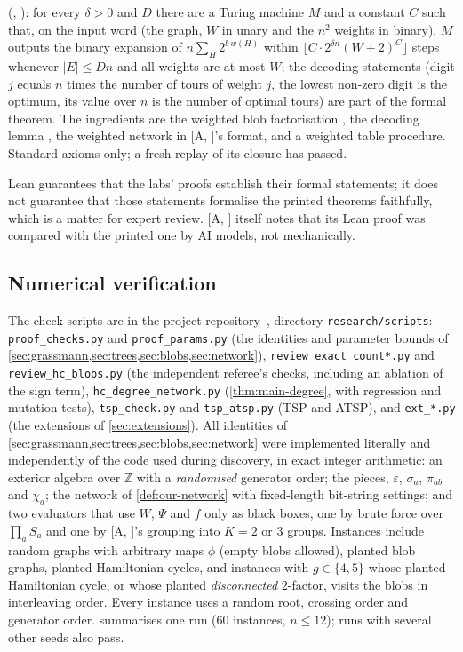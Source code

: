 \documentclass[11pt]{amsart}
\theoremstyle{plain}
\theoremstyle{definition}
\theoremstyle{remark}
\numberwithin{equation}{section}
\newcommand{\Z}{\mathbb{Z}}
\newcommand{\A}[1][]{\textup{[A\if\relax\detokenize{#1}\relax\else, #1\fi]}}
\begin{document}
\begin{itemize}
(, ): for every $\delta>0$ and $D$ there are a Turing
machine $M$ and a constant $C$ such that, on the input word  (the graph, $W$
in unary and the $n^2$ weights in binary), $M$ outputs the binary expansion of
$n\sum_H2^{b\,w(H)}$ within $\lfloor C\cdot2^{\delta n}(W+2)^C\rfloor$ steps whenever $|E|\le Dn$
and all weights are at most $W$; the decoding statements (digit $j$ equals $n$ times the number
of tours of weight $j$, the lowest non-zero digit is the optimum, its value over $n$ is the number
of optimal tours) are part of the formal theorem. The ingredients are the weighted blob
factorisation , the decoding lemma , the
weighted network  in \A's  format, and a weighted table procedure.
Standard axioms only; a fresh  replay of its closure has passed.
\end{itemize}
Lean guarantees that the labs' proofs establish their formal statements; it does not guarantee
that those statements formalise the printed theorems faithfully, which is a matter for expert
review. \A{} itself notes that its Lean proof was compared with the printed one by AI models, not
mechanically.

\subsection{Numerical verification}
The check scripts are in the project repository~\cite{TulsyanRepo26}, directory
\texttt{research/scripts}:
\texttt{proof\_checks.py} and \texttt{proof\_params.py} (the identities and parameter bounds of
\cref{sec:grassmann,sec:trees,sec:blobs,sec:network}), \texttt{review\_exact\_count*.py} and
\texttt{review\_hc\_blobs.py} (the independent referee's checks, including an ablation of the sign
term), \texttt{hc\_degree\_network.py} (\cref{thm:main-degree}, with regression and mutation tests),
\texttt{tsp\_check.py} and \texttt{tsp\_atsp.py} (TSP and ATSP), and \texttt{ext\_*.py} (the extensions
of \cref{sec:extensions}).
All identities of \cref{sec:grassmann,sec:trees,sec:blobs,sec:network} were implemented literally
and independently of the code used during discovery, in exact integer arithmetic: an exterior
algebra over $\Z$ with a \emph{randomised} generator order; the pieces, $\varepsilon$,
$\sigma_a$, $\pi_{ab}$ and $\chi_a$; the network of \cref{def:our-network} with fixed-length
bit-string settings; and two evaluators that use $W$, $\Psi$ and $f$ only as black boxes, one by
brute force over $\prod_aS_a$ and one by \A's grouping into $K=2$ or $3$ groups. Instances include
random graphs with arbitrary maps $\phi$ (empty blobs allowed), planted blob graphs, planted
Hamiltonian cycles, and instances with $g\in\{4,5\}$ whose planted Hamiltonian cycle, or whose
planted \emph{disconnected} $2$-factor, visits the blobs in interleaving order. Every instance uses
a random root, crossing order and generator order.  summarises one run (60
instances, $n\le12$); runs with several other seeds also pass.
\end{document}
